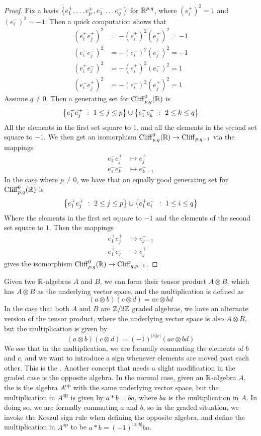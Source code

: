 \begin{proof}
Fix a basis $\left\lbrace e_1^+, \ldots e_p^+, e_1^- \ldots e_q^- \right\rbrace$ for $\mathbb{R}^{p,q}$, where
$(e_i^+)^2 = 1$ and $(e_i^-)^2 = -1$. Then a quick computation shows that
%
\begin{align*}
(e_i^+e_j^+)^2 &= -(e_i^+)^2(e_j^+)^2 = -1 \\
(e_i^-e_j^-)^2 &= -(e_i^-)^2(e_j^-)^2 = -1 \\
(e_i^+e_j^-)^2 &= -(e_i^+)^2(e_i^-)^2 = 1 \\
(e_i^-e_j^+)^2 &= -(e_i^-)^2(e_j^+)^2 = 1
\end{align*}
%
Assume $q \neq 0$. Then a generating set for $\operatorname{Cliff}_{p,q}^0(\mathbb{R})$ is
\[
\left\lbrace e_1^-e_j^+ ~:~ 1 \leq j \leq p \right\rbrace \cup \left\lbrace e_1^-e_k^- ~:~ 2 \leq k \leq q \right\rbrace
\]
All the elements in the first set square to $1$, and all the elements in the
second set square to $-1$. We then get an isomorphism
$\operatorname{Cliff}^0_{p,q}(\mathbb{R}) \to \operatorname{Cliff}_{p,q-1}$ via the mappings
\begin{align*}
e_1^-e_j^+ &\mapsto e_j^+ \\
e_1^-e_k^- &\mapsto e_{k-1}^-
\end{align*}
In the case where $p \neq 0$, we have that an equally good generating set for
$\operatorname{Cliff}_{p,q}^0(\mathbb{R})$ is
\[
\left\lbrace e^+_1e_j^+ ~:~ 2 \leq j \leq p \right\rbrace \cup \left\lbrace e_1^+e_i^- ~:~ 1 \leq i \leq q \right\rbrace
\]
Where the elements in the first set square to $-1$ and the elements of the second
set square to $1$. Then the mappings
\begin{align*}
e_1^+e_j^+ &\mapsto e_{j-1}^- \\
e_1^+e_j^- &\mapsto e_j^+
\end{align*}
gives the isomorphism $\operatorname{Cliff}_{p,q}^0(\mathbb{R}) \to \operatorname{Cliff}_{q, p-1}$.
\end{proof}
%
Given two $\mathbb{R}$-algebras $A$ and $B$, we can form their tensor product
$A \otimes B$, which has $A \otimes B$ as the underlying vector space, and the
multiplication is defined as
\[
(a \otimes b)(c \otimes d) = ac \otimes bd
\]
In the case that both $A$ and $B$ are $\mathbb{Z}/2\mathbb{Z}$ graded algebras, we have an alternate
version of the tensor product, where the underlying vector space is also
$A \otimes B$, but the multiplication is given by
\[
(a \otimes b)(c \otimes d) = (-1)^{|b||c|}(ac \otimes bd)
\]
We see that in the multiplication, we are formally commuting the elements of
$b$ and $c$, and we want to introduce a sign whenever elements are moved past
each other. This is the . Another concept that needs
a slight modification in the graded case is the opposite algebra. In the
normal case, given an $\mathbb{R}$-algebra $A$, the  is
the algebra $A^{\text{op}}$ with the same underlying vector space, but
the multiplication in $A^\text{op}$ is given by $a * b = ba$, where $ba$
is the multiplication in $A$. In doing so, we are formally commuting $a$
and $b$, so in the graded situation, we invoke the Koszul sign rule when
defining the opposite algebra, and define the multiplication in $A^{\text{op}}$
to be $a * b = (-1)^{|a||b|} ba$.\\

